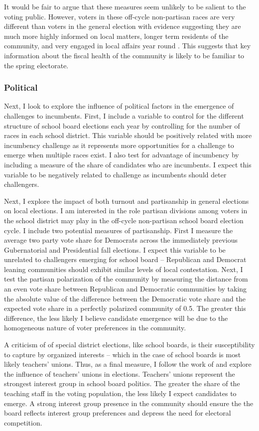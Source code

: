 It would be fair to argue that these measures seem unlikely to be salient to the 
voting public. However, voters in these off-cycle non-partisan races are very 
different than voters in the general election with evidence suggesting they are 
much more highly informed on local matters, longer term residents of the community, 
and very engaged in local affairs year round \citep{oliver}. This suggests that 
key information about the fiscal health of the community is likely to be 
familiar to the spring electorate. 

\subsubsection{Political}
Next, I look to explore the influence of political factors in the emergence of 
challenges to incumbents. First, I include a variable to control for the 
different structure of school board elections each year by controlling for the number of 
races in each school district. This variable should be positively related with 
more incumbency challenge as it represents more opportunities for a challenge 
to emerge when multiple races exist. I also test for advantage of incumbency 
by including a measure of the share of candidates who are incumbents. I expect 
this variable to be negatively related to challenge as incumbents should deter 
challengers. 

Next, I explore the impact of both turnout and partisanship in general elections 
on local elections. I am interested in the role partisan divisions among voters 
in the school district may play in the off-cycle non-partisan school board 
election cycle. I include two potential measures of partisanship. First I 
measure the average two party vote share for Democrats across the immediately 
previous Gubernatorial and Presidential fall elections. I expect this variable 
to be unrelated to challengers emerging for school board -- Republican and Democrat 
leaning communities should exhibit similar levels of local contestation. Next, I test the 
partisan polarization of the community by measuring the distance from an even 
vote share between Republican and Democratic communities by taking the absolute 
value of the difference between the Democratic vote share and the expected vote 
share in a perfectly polarized community of 0.5. The greater this difference, the 
less likely I believe candidate emergence will be due to the homogeneous nature 
of voter preferences in the community. 

A criticism of of special district elections, like school boards, is their susceptibility 
to capture by organized interests -- which in the case of school boards is most 
likely teachers' unions. Thus, as a final measure, I follow the work of 
\citet{RefWorks:207,anzia11} and explore the influence of teachers' unions in 
elections. Teachers' unions represent the strongest interest group in school board 
politics. The greater the share of the teaching staff in the voting population, 
the less likely I expect candidates to emerge. A strong interest group presence 
in the community should ensure the the board reflects interest group preferences 
and depress the need for electoral competition. 

